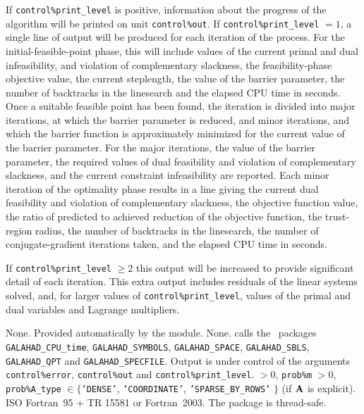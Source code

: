 \documentclass{galahad}
\newcommand{\packagename}{BLLS}
\begin{document}

\galinfo
If {\tt control\%print\_level} is positive, information about the progress
of the algorithm will be printed on unit {\tt control\-\%out}.
If {\tt control\%print\_level} $= 1$, a single line of output will be produced
for each iteration of the process.
For the initial-feasible-point phase,
this will include values of the current primal and dual infeasibility, and
violation of complementary slackness, the feasibility-phase objective value,
the current steplength, the value of the barrier parameter, the
number of backtracks in the linesearch and the elapsed CPU time in seconds.
Once a suitable feasible point has been found, the iteration is divided
into major iterations, at which the barrier parameter is reduced, and
minor iterations, and which the barrier function is approximately minimized
for the current value of the barrier parameter. For the major iterations,
the value of the barrier parameter, the required values of
dual feasibility and violation of complementary slackness, and the current
constraint infeasibility are reported. Each minor iteration of the
optimality phase results in a line giving
the current dual feasibility and violation of complementary slackness, the
objective function value, the ratio of predicted to achieved reduction
of the objective function, the trust-region radius, the
number of backtracks in the linesearch, the number of conjugate-gradient
iterations taken, and the elapsed CPU time in seconds.

If {\tt control\%print\_level} $\geq 2$ this
output will be increased to provide significant detail of each iteration.
This extra output includes residuals of the linear systems solved, and,
for larger values of {\tt control\%print\_level}, values of the primal and dual
variables and Lagrange multipliers.


\galgeneral

\galcommon None.
\galworkspace Provided automatically by the module.
\galroutines None.
\galmodules {\tt \packagename\_solve} calls the \galahad\ packages
{\tt GALAHAD\_CPU\_time},
{\tt GALAHAD\_SY\-M\-BOLS}, \newline
{\tt GALAHAD\_SPACE},
{\tt GALAHAD\_SBLS},
{\tt GALAHAD\_QPT} and
{\tt GALAHAD\_SPECFILE}.
\galio Output is under control of the arguments
 {\tt control\%error}, {\tt control\%out} and {\tt control\%print\_level}.
 $> 0$, {\tt prob\%m} $> 0$,
{\tt prob\%A\_type} $\in \{${\tt 'DENSE'},
 {\tt 'COORDINATE'}, {\tt 'SPARSE\_BY\_\-ROWS'} $\}$
(if ${\mathbf{A}}$ is explicit).
\galportability ISO Fortran~95 + TR 15581 or Fortran~2003.
The package is thread-safe.
\end{document}
